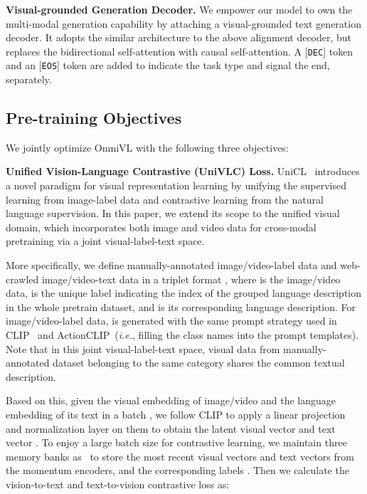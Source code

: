 \documentclass{article}
\makeatletter
\newcommand*{\system}{OmniVL\@\xspace}
\newcommand*{\ie}{\emph{i.e.}\@\xspace}
\makeatother
\begin{document}
\noindent \textbf{Visual-grounded Generation Decoder.} We empower our model to own the multi-modal generation capability by attaching a visual-grounded text generation decoder. It adopts the similar architecture to the above alignment decoder, but replaces the bidirectional self-attention with causal self-attention. A [\texttt{DEC}] token and an [\texttt{EOS}] token are added to indicate the task type and signal the end, separately. 


\subsection{Pre-training Objectives}
\label{sec:obj}
We jointly optimize \system with the following three objectives:

\noindent \textbf{Unified Vision-Language Contrastive (UniVLC) Loss.} UniCL~\cite{yang2022unified} introduces a novel paradigm for visual representation learning by unifying the supervised learning from image-label data and contrastive learning from the natural language supervision. In this paper, we extend its scope to the unified visual domain, which incorporates both image and video data for cross-modal pretraining via a joint visual-label-text space. 

More specifically, we define manually-annotated image/video-label data and web-crawled image/video-text data in a triplet format , where  is the image/video data,  is the unique label indicating the index of the grouped language description in the whole pretrain dataset, and  is its corresponding language description. For image/video-label data,  is generated with the same prompt strategy used in CLIP~\cite{radford2021learning} and ActionCLIP~\cite{wang2021actionclip}(\ie, filling the class names into the prompt templates). Note that in this joint visual-label-text space, visual data from manually-annotated dataset belonging to the same category shares the common textual description.

Based on this, given the visual embedding of image/video  and the language embedding of its text  in a batch , we follow CLIP to apply a linear projection and normalization layer on them to obtain the latent visual vector  and text vector . To enjoy a large batch size for contrastive learning, we maintain three memory banks as~\cite{he2020momentum,li2021align} to store the most recent  visual vectors  and text vectors  from the momentum encoders, and the corresponding labels . Then we calculate the vision-to-text and text-to-vision contrastive loss as:
\end{document}
